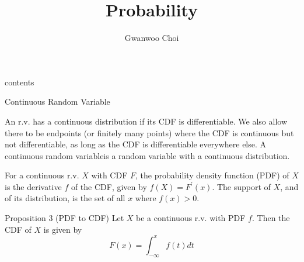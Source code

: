 \documentclass[8pt]{beamer}
\title{Probability}
\author{Gwanwoo Choi}
\begin{document}
\begin{frame}
    \titlepage
\end{frame}

\begin{frame}{contents}
    \tableofcontents
\end{frame}

\begin{frame}{Continuous Random Variable}
    \begin{definition}[Continuous r.v.]
        An r.v. has a continuous distribution if its CDF is differentiable. We also allow there to be endpoints (or finitely many points) where the CDF is continuous but not differentiable, as long as the CDF is differentiable everywhere else. A continuous random variableis a random variable with a continuous distribution.
    \end{definition}

    \begin{definition}
        For a continuous r.v. $X$ with CDF $F$, the probability density function (PDF) of $X$ is the derivative $f$ of the CDF, given by $f(X) = F^\prime(x)$. The support of $X$, and of its distribution, is the set of all $x$ where $f(x)>0$.
    \end{definition}

    \begin{block}{Proposition 3 (PDF to CDF)}
        Let $X$ be a continuous r.v. with PDF $f$. Then the CDF of $X$ is given by 
        \[F(x) = \int^x_{- \infty} f(t) dt\]
    \end{block}

\end{frame}
\end{document}
